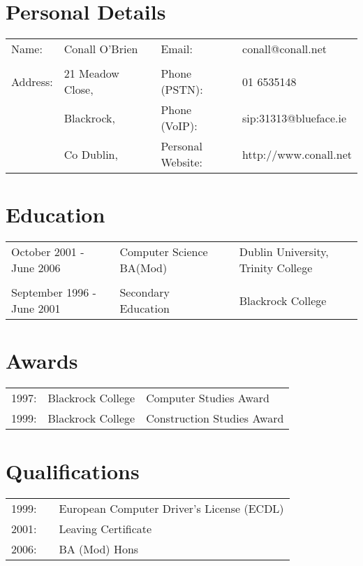 \documentclass[a4paper, 11pt] {article}
\begin{document}
\section*{Personal Details}

\begin{tabular}{l l l l l}
Name: 	& Conall O'Brien		&	&	Email: 				& conall@conall.net 	  	\\	
			&							&	&							&								\\
Address:	& 21 Meadow Close, 	&	&	Phone (PSTN):		& 01 6535148\\
			& Blackrock,			&	&	Phone (VoIP):		& sip:31313@blueface.ie	\\
			& Co Dublin, 		 	&  &	Personal Website:	& http://www.conall.net	\\
\end{tabular}

\section*{Education}

\begin{tabular}{l l l l}
October 2001 - June 2006	& Computer Science BA(Mod)	&	&	Dublin University, Trinity College \\
							&									&	&	\\
September 1996 - June 2001	& Secondary Education	&	&	Blackrock College	\\
\end{tabular}

\section*{Awards}

\begin{tabular}{l l l}
1997:	& Blackrock College	 & 	Computer Studies Award 		\\
1999:	& Blackrock College 	 & 	Construction Studies Award	\\
\end{tabular}

\section*{Qualifications}

\begin{tabular}{l l l}
1999: 	& 	&	European Computer Driver's License (ECDL) 		\\
2001:		& 	&	Leaving Certificate 										\\
2006:		& 	&	BA (Mod) Hons												\\
\end{tabular}
\end{document}
